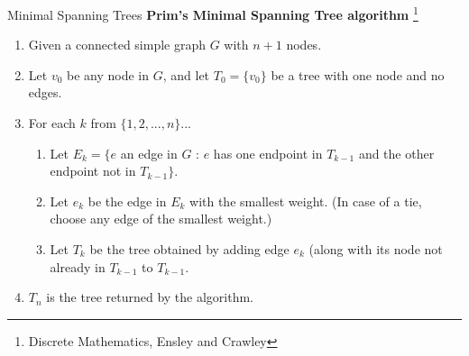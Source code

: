     \begin{intro}{Minimal Spanning Trees}
        \textbf{Prim's Minimal Spanning Tree algorithm}
        \footnote{Discrete Mathematics, Ensley and Crawley}
        \begin{enumerate}
            \item   Given a connected simple graph $G$ with $n+1$ nodes.
            \item   Let $v_{0}$ be any node in $G$, and let $T_{0} = \{v_{0}\}$
                    be a tree with one node and no edges.
            \item   For each $k$ from $\{1, 2, ..., n\}$...
            \begin{enumerate}
                \item   Let $E_{k} = \{e$ an edge in $G$ : $e$ has one endpoint in $T_{k-1}$ and
                        the other endpoint not in $T_{k-1}\}$.
                \item   Let $e_{k}$ be the edge in $E_{k}$ with the smallest weight.
                        (In case of a tie, choose any edge of the smallest weight.)
                \item   Let $T_{k}$ be the tree obtained by adding edge $e_{k}$
                        (along with its node not already in $T_{k-1}$ to $T_{k-1}$.
            \end{enumerate}
            \item   $T_{n}$ is the tree returned by the algorithm.
        \end{enumerate}
    \end{intro}

